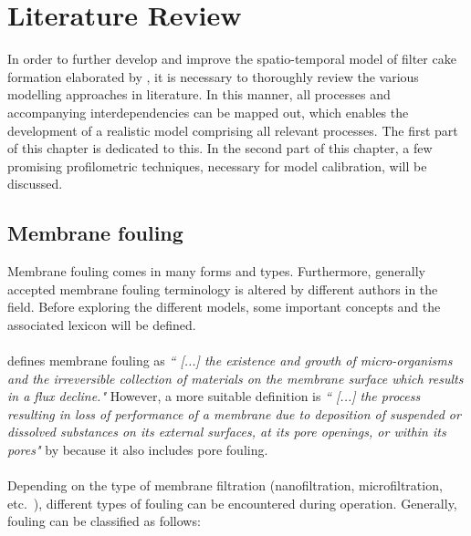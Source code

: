 \hyphenation{}
\chapter[Literature Review]%
{Literature Review \label{litRev}}

In order to further develop and improve the spatio-temporal model of filter cake formation elaborated by \cite{Ghijs2014}, it is necessary to thoroughly review the various modelling approaches in literature. In this manner, all processes and accompanying interdependencies can be mapped out, which enables the development of a realistic model comprising all relevant processes. The first part of this chapter is dedicated to this. In the second part of this chapter, a few promising profilometric techniques, necessary for model calibration, will be discussed.

\section{Membrane fouling}
Membrane fouling comes in many forms and types. Furthermore, generally accepted membrane fouling terminology is altered by different authors in the field. Before exploring the different models, some important concepts and the associated lexicon will be defined. \\ \\
\cite{Mohammadi2003} defines membrane fouling as \textit{`` [...] the existence and growth of micro-organisms and the irreversible collection of materials on the membrane surface which results in a flux decline."} However, a more suitable definition is \textit{`` [...] the process resulting in loss of performance of a membrane due to deposition of suspended or dissolved substances on its external surfaces, at its pore openings, or within its pores"} by \cite{Shimidzu1996} because it also includes pore fouling. \\ \\
Depending on the type of membrane filtration (nanofiltration, microfiltration, etc.\ ), different types of fouling can be encountered during operation. Generally, fouling can be classified as follows:

